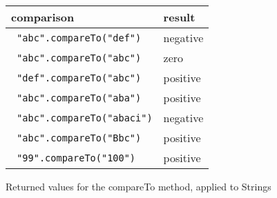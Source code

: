 





\begin {figure}

\begin {tabular}{|l|l|}
\hline
comparison 				& 	result		\\
\hline
\texttt { "abc".compareTo("def")}	&	negative	\\
\texttt { "abc".compareTo("abc")}	&	zero    	\\
\texttt { "def".compareTo("abc")}	&	positive	\\
\texttt { "abc".compareTo("aba")}	&	positive	\\
\texttt { "abc".compareTo("abaci")}	&	negative	\\
\texttt { "abc".compareTo("Bbc")}	&	positive	\\
\texttt { "99".compareTo("100")}	&	positive	\\
\hline

\end {tabular}



\caption {Returned values for the compareTo method, applied
to Strings}

\label {fig:compareTo}

\end {figure}


